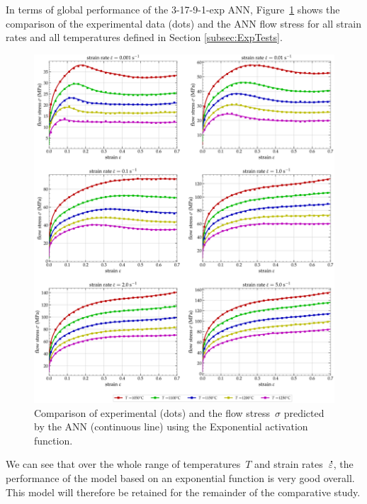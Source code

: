 \documentclass[algorithms,article,submit,pdftex,oneauthors]{Definitions/mdpi}
\DeclareRobustCommand{\mdot}[1]{\accentset{\mbox{\bfseries .}}{#1}}
\begin{document}
In terms of global performance of the 3-17-9-1-exp ANN, Figure~\ref{fig:ANN-ExpFit} shows the comparison of the experimental data (dots) and the ANN flow stress for all strain rates and all temperatures defined in Section \ref{subsec:ExpTests}.
\begin{figure}[h!]
\centering
\includegraphics[width=0.95\columnwidth]{Figures/3Cr2Mo-3-17-9-1-exponential}
\caption{Comparison of experimental (dots) and the flow stress~$\sigma$ predicted by the ANN (continuous line) using the Exponential activation function.}
\label{fig:ANN-ExpFit}
\end{figure}
We can see that over the whole range of temperatures~$T$ and strain rates~$\mdot{\varepsilon}$, the performance of the model based on an exponential function is very good overall.
This model will therefore be retained for the remainder of the comparative study.

\end{document}
